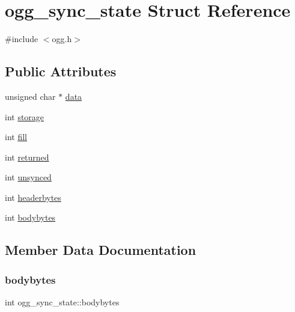 \hypertarget{structogg__sync__state}{}\section{ogg\+\_\+sync\+\_\+state Struct Reference}
\label{structogg__sync__state}


{\ttfamily \#include $<$ogg.\+h$>$}

\subsection*{Public Attributes}
\begin{DoxyCompactItemize}
\item 
unsigned char $\ast$ \hyperlink{structogg__sync__state_adfc3f5d5a6434a582205ece0327fcc7d}{data}
\item 
int \hyperlink{structogg__sync__state_a15fc1bb5161fc4ae87b7a65982776c24}{storage}
\item 
int \hyperlink{structogg__sync__state_a3afef65cd358eab5827304b8c2360c7f}{fill}
\item 
int \hyperlink{structogg__sync__state_ac1b56ee81f71737f2f6397907f55a2e9}{returned}
\item 
int \hyperlink{structogg__sync__state_a8d538bb32400470f00080e2160158a76}{unsynced}
\item 
int \hyperlink{structogg__sync__state_abb64d78f386bc413527df838f2f681d5}{headerbytes}
\item 
int \hyperlink{structogg__sync__state_aa7ea6e81b751baaa04e4b49cb04e8317}{bodybytes}
\end{DoxyCompactItemize}


\subsection{Member Data Documentation}
\mbox{\label{structogg__sync__state_aa7ea6e81b751baaa04e4b49cb04e8317}} 
\subsubsection{\texorpdfstring{bodybytes}{bodybytes}}
{\footnotesize\ttfamily int ogg\+\_\+sync\+\_\+state\+::bodybytes}

\mbox{\label{structogg__sync__state_adfc3f5d5a6434a582205ece0327fcc7d}} 
